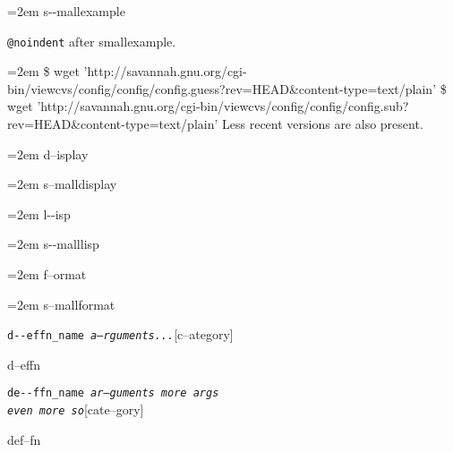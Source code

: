 \documentclass{book}
\begin{document}
\begin{titlepage}
\par\begingroup\obeylines\obeyspaces\frenchspacing\leftskip=2em\relax\parskip=0pt\relax\ttfamily\footnotesize{}%
s{-}{-}mallexample
\endgroup{}%

\texttt{@noindent} after smallexample.
\par\begingroup\obeylines\obeyspaces\frenchspacing\leftskip=2em\relax\parskip=0pt\relax\ttfamily\footnotesize{}%
\$ wget 'http://savannah.gnu.org/cgi-bin/viewcvs/config/config/config.guess?rev=HEAD\&content-type=text/plain'
\$ wget 'http://savannah.gnu.org/cgi-bin/viewcvs/config/config/config.sub?rev=HEAD\&content-type=text/plain'
\endgroup{}%
\noindent{}Less recent versions are also present.

\par\begingroup\obeylines\obeyspaces\frenchspacing\leftskip=2em\relax\parskip=0pt\relax{}%
d--isplay
\endgroup{}%

\par\begingroup\obeylines\obeyspaces\frenchspacing\leftskip=2em\relax\parskip=0pt\relax\footnotesize{}%
s--malldisplay
\endgroup{}%

\par\begingroup\obeylines\obeyspaces\frenchspacing\leftskip=2em\relax\parskip=0pt\relax\ttfamily{}%
l{-}{-}isp
\endgroup{}%

\par\begingroup\obeylines\obeyspaces\frenchspacing\leftskip=2em\relax\parskip=0pt\relax\ttfamily\footnotesize{}%
s{-}{-}malllisp
\endgroup{}%

\par\begingroup\obeylines\obeyspaces\frenchspacing\leftskip=2em\relax\parskip=0pt\relax{}%
f--ormat
\endgroup{}%

\par\begingroup\obeylines\obeyspaces\frenchspacing\leftskip=2em\relax\parskip=0pt\relax\footnotesize{}%
s--mallformat
\endgroup{}%

\noindent\texttt{d{-}{-}effn\_name \EmbracOn{}\textnormal{\textsl{a--rguments...}}\EmbracOff{}}\hfill[c--ategory]



%
d--effn

\noindent\texttt{de{-}{-}ffn\_name \EmbracOn{}\textnormal{\textsl{ar--guments    more args \leavevmode{}\\ even more so}}\EmbracOff{}}\hfill[cate--gory]



%
def--fn


\end{titlepage}
\end{document}
